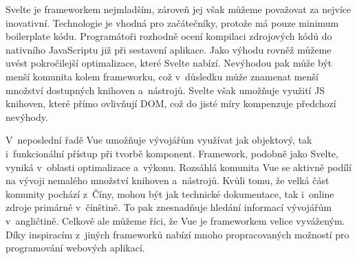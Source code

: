 Svelte je frameworkem nejmladším, zároveň jej však můžeme považovat za nejvíce inovativní. 
Technologie je vhodná pro začátečníky, protože má pouze minimum boilerplate kódu. 
Programátoři rozhodně ocení kompilaci zdrojových kódů do nativního JavaScriptu již při sestavení aplikace. 
Jako výhodu rovněž můžeme uvést pokročilejší optimalizace, které Svelte nabízí. 
Nevýhodou pak může být menší komunita kolem frameworku, což v~důsledku může znamenat menší množství dostupných knihoven a~nástrojů. 
Svelte však umožňuje využití JS knihoven, které přímo ovlivňují DOM, což do jisté míry kompenzuje předchozí nevýhody.

V~neposlední řadě Vue umožňuje vývojářům využívat jak objektový, tak i~funkcionální přístup při tvorbě komponent. 
Framework, podobně jako Svelte, vyniká v~oblasti optimalizace a~výkonu. Rozsáhlá komunita Vue se aktivně podílí na vývoji nemalého množství knihoven a~nástrojů. 
Kvůli tomu, že velká část komunity pochází z~Číny, mohou být jak technické dokumentace, tak i~online zdroje primárně v~čínštině. 
To pak znesnadňuje hledání informací vývojářům v~angličtině. Celkově ale můžeme říci, že Vue je frameworkem velice vyváženým. 
Díky inspiracím z~jiných frameworků nabízí mnoho propracovaných možností pro programování webových aplikací.